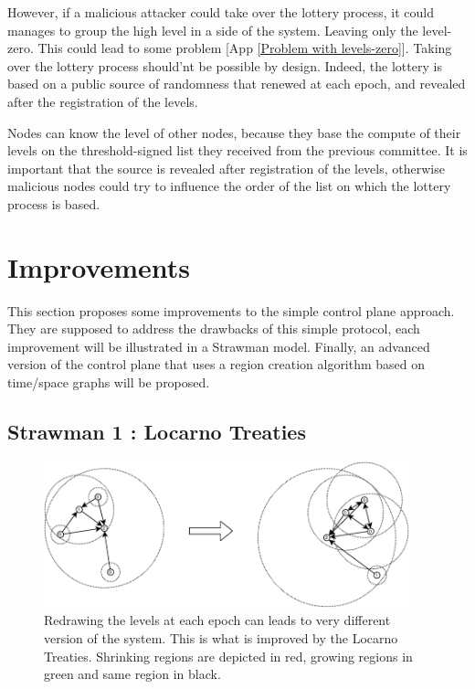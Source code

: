 \documentclass[a4paper,11pt,oneside]{report}
\begin{document}
However, if a malicious attacker could take over the lottery process, it could
manages to group the high level in a side of the system. Leaving only the
level-zero. This could lead to some problem [App \autoref{Problem with
levels-zero}]. Taking over the lottery process should'nt be possible by design.
Indeed, the lottery is based on a public source of randomness that renewed at
each epoch, and revealed after the registration of the levels. 

Nodes can know the level of other nodes, because they base the compute of their
levels on the threshold-signed list they received from the previous committee.
It is important that the source is revealed after registration of the levels,
otherwise malicious nodes could try to influence the order of the list on which
the lottery process is based. 



\chapter{Improvements}
This section proposes some improvements to the simple control plane approach. They
are supposed to address the drawbacks of this simple protocol, each improvement
will be illustrated in a Strawman model. Finally, an advanced
version of the control plane that uses a region creation algorithm based on
time/space graphs will be proposed. 

\section{Strawman 1 : Locarno Treaties} \label{Locarno}

\begin{figure}[!h] 
\centering
\includegraphics[width=300pt]{figures/LocarnoTreaties-Redrawing}
\caption{Redrawing the levels at each epoch can leads to very different version
    of the system. This is what is improved by the Locarno Treaties. Shrinking
    regions are depicted in red, growing regions in green and same region in
    black.} \label{fig:LocarnoTreaties-Redrawing}
\end{figure}
\end{document}
